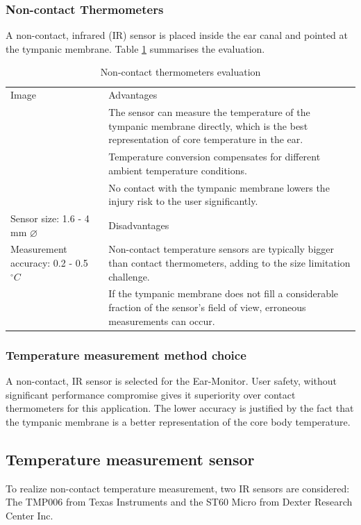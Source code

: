 \subsubsection{Non-contact Thermometers}
A non-contact, infrared (IR) sensor is placed inside the ear canal and pointed at the tympanic membrane. Table \ref{tab:NonContactThermometers_Eval} summarises the evaluation.

\begin{table}[H]
\caption{Non-contact thermometers evaluation}
\label{tab:NonContactThermometers_Eval}
\renewcommand{\arraystretch}{1.3}	%
\centering
\begin{tabular}{|p{5cm}|p{8cm}|} 
 \hline
 Image 	& 	Advantages  \\ 
		&	\tabitem The sensor can measure the temperature of the tympanic membrane directly, which is the best representation of core temperature in the ear.\\
  		&	\tabitem Temperature conversion compensates for different ambient temperature conditions.\\
  		&	\tabitem No contact with the tympanic membrane lowers the injury risk to the user significantly.\\
\hline
Sensor size: 1.6 - 4 mm ${\diameter}$			&	Disadvantages  \\ 
Measurement accuracy: 0.2 - 0.5  $^{\circ}C$ 	&	\tabitem Non-contact temperature sensors are typically bigger than contact thermometers, adding to the size limitation challenge.\\
  												&	\tabitem If the tympanic membrane does not fill a considerable fraction of the sensor's field of view, erroneous measurements can occur.\\
 
 \hline
\end{tabular}
\end{table}

\subsubsection{Temperature measurement method choice}
A non-contact, IR sensor is selected for the Ear-Monitor. User safety, without significant performance compromise gives it superiority over contact thermometers for this application. The lower accuracy is justified by the fact that the tympanic membrane is a better representation of the core body temperature.

\subsection{Temperature measurement sensor}
To realize non-contact temperature measurement, two IR sensors are considered: The TMP006 from Texas Instruments and the ST60 Micro from Dexter Research Center Inc.

